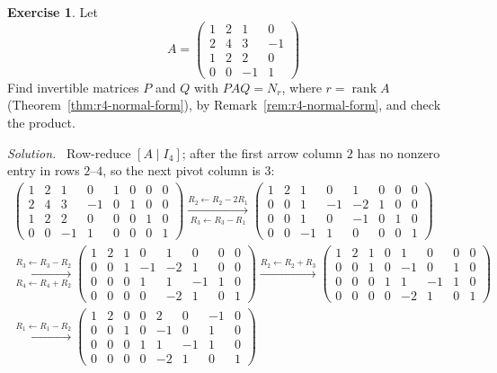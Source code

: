 \documentclass[12pt]{article}
\DeclareMathOperator{\rank}{rank}
\theoremstyle{definition}
\newtheorem{exercise}{Exercise}
\newenvironment{solution}{\par\noindent\textit{Solution.}\ }{\par\smallskip}
\begin{document}
\begin{exercise}\label{r4-dr-normal-form}
Let
\[
A=\begin{pmatrix}1&2&1&0\\2&4&3&-1\\1&2&2&0\\0&0&-1&1\end{pmatrix}
\]
Find invertible matrices \(P\) and \(Q\) with \(PAQ=N_r\), where \(r=\rank A\) (Theorem~\ref{thm:r4-normal-form}), by
Remark~\ref{rem:r4-normal-form}, and check the product.
\end{exercise}
\begin{solution}
Row-reduce \([A\mid I_4]\); after the first arrow column \(2\) has no nonzero entry in rows \(2\)--\(4\), so the next
pivot column is \(3\):
\[
\begin{gathered}
\left(\begin{array}{cccc|cccc}1&2&1&0&1&0&0&0\\2&4&3&-1&0&1&0&0\\1&2&2&0&0&0&1&0\\0&0&-1&1&0&0&0&1\end{array}\right)
\xrightarrow[R_3\leftarrow R_3-R_1]{R_2\leftarrow R_2-2R_1}
\left(\begin{array}{cccc|cccc}1&2&1&0&1&0&0&0\\0&0&1&-1&-2&1&0&0\\0&0&1&0&-1&0&1&0\\0&0&-1&1&0&0&0&1\end{array}\right)
\\
\xrightarrow[R_4\leftarrow R_4+R_2]{R_3\leftarrow R_3-R_2}
\left(\begin{array}{cccc|cccc}1&2&1&0&1&0&0&0\\0&0&1&-1&-2&1&0&0\\0&0&0&1&1&-1&1&0\\0&0&0&0&-2&1&0&1\end{array}\right)
\xrightarrow{R_2\leftarrow R_2+R_3}
\left(\begin{array}{cccc|cccc}1&2&1&0&1&0&0&0\\0&0&1&0&-1&0&1&0\\0&0&0&1&1&-1&1&0\\0&0&0&0&-2&1&0&1\end{array}\right)
\\
\xrightarrow{R_1\leftarrow R_1-R_2}
\left(\begin{array}{cccc|cccc}1&2&0&0&2&0&-1&0\\0&0&1&0&-1&0&1&0\\0&0&0&1&1&-1&1&0\\0&0&0&0&-2&1&0&1\end{array}\right)

\end{gathered}\]
\end{solution}
\end{document}
